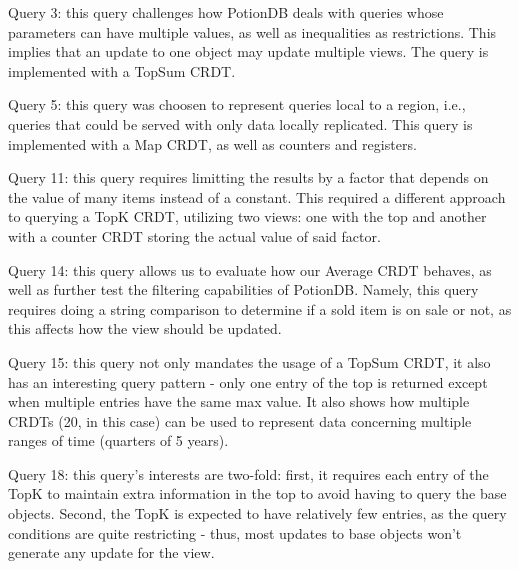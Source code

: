 \documentclass[sigplan,10pt]{acmart}
\begin{document}
\begin{compactitem}
	\item Query 3: this query challenges how PotionDB deals with queries whose parameters can have multiple values, as well as inequalities as restrictions. 
	This implies that an update to one object may update multiple views. 
	The query is implemented with a TopSum CRDT. %
	\item Query 5: this query was choosen to represent queries local to a region, i.e., queries that could be served with only data locally replicated. %
	This query is implemented with a Map CRDT, as well as counters and registers.
	\item Query 11: this query requires limitting the results by a factor that depends on the value of many items instead of a constant.
	This required a different approach to querying a TopK CRDT, utilizing two views: one with the top and another with a counter CRDT storing the actual value of said factor.
	\item Query 14: this query allows us to evaluate how our Average CRDT behaves, as well as further test the filtering capabilities of PotionDB.
	Namely, this query requires doing a string comparison to determine if a sold item is on sale or not, as this affects how the view should be updated.
	\item Query 15: this query not only mandates the usage of a TopSum CRDT, it also has an interesting query pattern - only one entry of the top is returned except when multiple entries have the same max value.
	It also shows how multiple CRDTs (20, in this case) can be used to represent data concerning multiple ranges of time (quarters of 5 years).
	\item Query 18: this query's interests are two-fold: %
	first, it requires each entry of the TopK to maintain extra information in the top to avoid having to query the base objects.
	Second, the TopK is expected to have relatively few entries, as the query conditions are quite restricting - thus, most updates to base objects won't generate any update for the view.
\end{compactitem}
\end{document}
